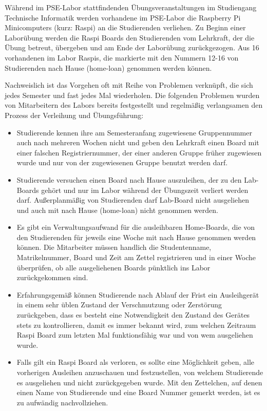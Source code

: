 Während im PSE-Labor stattfindenden Übungsveranstaltungen im Studiengang Technische Informatik werden vorhandene im PSE-Labor die Raspberry Pi Minicomputers (kurz: Raspi)  an die Studierenden verliehen. Zu Beginn einer Laborübung werden die Raspi Boards den Studierenden vom Lehrkraft, der die Übung betreut, übergeben und am Ende der Laborübung zurückgezogen. Aus 16 vorhandenen im Labor Raspis, die markierte mit den Nummern 12-16 von Studierenden nach Hause (home-loan) genommen werden können.\cite{website:1} 

Nachweislich ist das Vorgehen oft mit Reihe von Problemen verknüpft, die sich jedes Semester und fast jedes Mal wiederholen. Die folgenden Problemen wurden von Mitarbeitern des Labors bereits festgestellt und regelmäßig verlangsamen den Prozess der Verleihung und Übungsführung: 
\begin{itemize}
	\item Studierende kennen ihre am Semesteranfang zugewiesene Gruppennummer auch nach mehreren Wochen nicht und geben den Lehrkraft einen Board mit einer falschen Registriernummer, der einer anderen Gruppe früher zugewiesen wurde und nur von der zugewiesenen Gruppe benutzt werden darf. 
	\item Studierende versuchen  einen Board nach Hause auszuleihen, der zu den Lab-Boards gehört und nur im Labor während der Übungszeit verliert werden darf. Außerplanmäßig von Studierenden darf Lab-Board nicht ausgeliehen und auch mit nach Hause (home-loan) nicht genommen werden.
	\item Es gibt ein Verwaltungsaufwand für die ausleihbaren Home-Boards, die von den Studierenden für jeweils eine Woche mit nach Hause genommen werden können. Die Mitarbeiter müssen handlich die Studentenname, Matrikelnummer, Board und Zeit am Zettel registrieren und in einer Woche überprüfen, ob alle ausgeliehenen Boards pünktlich ins Labor zurückgekommen sind. 
	\item Erfahrungsgemäß können Studierende nach Ablauf der Frist ein Ausleihgerät in einem sehr üblen Zustand der Verschmutzung oder Zerstörung zurückgeben, dass es besteht eine Notwendigkeit den Zustand des Gerätes stets zu kontrollieren, damit es immer bekannt wird, zum welchen Zeitraum Raspi Board zum letzten Mal funktionsfähig war und von wem ausgeliehen wurde.  
	\item Falls gilt ein Raspi Board als verloren, es sollte eine Möglichkeit geben, alle vorherigen Ausleihen anzuschauen und festzustellen, von welchem Studierende es ausgeliehen und nicht zurückgegeben wurde. Mit den Zettelchen, auf denen einen Name von Studierende und eine Board Nummer gemerkt werden, ist es zu aufwändig nachvollziehen.	
\end{itemize}

